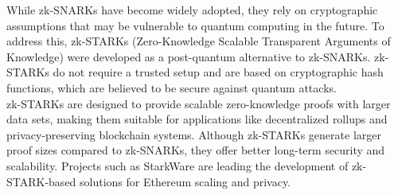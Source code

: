 While zk-SNARKs have become widely adopted, they rely on cryptographic assumptions that may be vulnerable to quantum computing in the future. To address this, zk-STARKs (Zero-Knowledge Scalable Transparent Arguments of Knowledge) were developed as a post-quantum alternative to zk-SNARKs. zk-STARKs do not require a trusted setup and are based on cryptographic hash functions, which are believed to be secure against quantum attacks.
\\
zk-STARKs are designed to provide scalable zero-knowledge proofs with larger data sets, making them suitable for applications like decentralized rollups and privacy-preserving blockchain systems. Although zk-STARKs generate larger proof sizes compared to zk-SNARKs, they offer better long-term security and scalability. Projects such as StarkWare are leading the development of zk-STARK-based solutions for Ethereum scaling and privacy.
